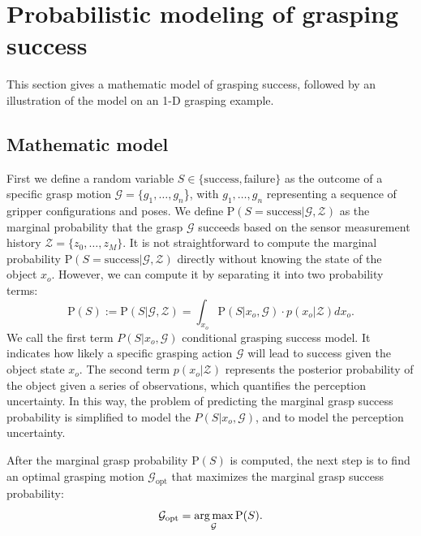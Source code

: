 \section{Probabilistic modeling of grasping success}
This section gives a mathematic model of grasping success, followed by an illustration of the model on an 1-D grasping example.  
\subsection{Mathematic model}
First we define a random variable $S \in \{ \text{success} , \text{failure} \}$ as the outcome of a specific grasp motion $\mathcal{G} = \{g_1, \dots ,g_n$\}, with $g_1, \dots ,g_n$ representing a sequence of gripper configurations and poses. We define $\text{P}({S = \text{success}}|\mathcal{G},\mathcal{Z})$ as the marginal probability that the grasp $\mathcal{G}$ succeeds based on the sensor measurement history $\mathcal{Z}=\lbrace z_0, \dots ,z_M \rbrace$. It is not straightforward to compute the marginal probability $\text{P}({S = \text{success}}|\mathcal{G},\mathcal{Z})$ directly without knowing the state of the object 
$x_o$. However, we can compute it by separating it into two probability terms: 
\begin{equation}
\text{P}(S) := \text{P}(S | \mathcal{G} ,\mathcal{Z}) = \int_{x_o} \text{P} (S | x_o,\mathcal{G} )\cdot p(x_o|\mathcal{Z}) dx_o. 
\label{e_grasp_success}
\end{equation}
We call the first term $P(S | x_o,\mathcal{G})$ conditional grasping success model. It indicates how likely a specific grasping action $\mathcal{G}$ will lead to success given the object state $x_o$. The second term $p(x_o|\mathcal{Z})$ represents the posterior probability of the object given a series of observations, which quantifies the perception uncertainty. In this way, the problem of predicting the marginal grasp success probability is simplified to model the $P(S | x_o,\mathcal{G})$, and to model the perception uncertainty. 

After the marginal grasp probability $\text{P}(S)$ is computed, the next step is to find an optimal grasping motion $\mathcal{G}_\text{opt}$ that maximizes the marginal grasp success probability:
\begin{equation}
\mathcal{G}_\text{opt} = \operatorname*{arg\,max}_\mathcal{G} \text{P}(S).
\label{eq_g_opt}
\end{equation}

